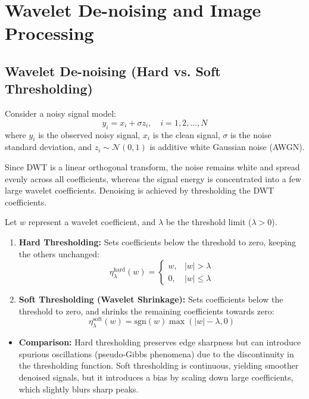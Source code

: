 \documentclass[12pt,a4paper]{article}
\begin{document}
\section{Wavelet De-noising and Image Processing}

\subsection{Wavelet De-noising (Hard vs. Soft Thresholding)}
Consider a noisy signal model:
$$y_i = x_i + \sigma z_i, \quad i = 1, 2, \dots, N$$
where $y_i$ is the observed noisy signal, $x_i$ is the clean signal, $\sigma$ is the noise standard deviation, and $z_i \sim \mathcal{N}(0, 1)$ is additive white Gaussian noise (AWGN).

Since DWT is a linear orthogonal transform, the noise remains white and spread evenly across all coefficients, whereas the signal energy is concentrated into a few large wavelet coefficients. Denoising is achieved by thresholding the DWT coefficients.

\begin{tcolorbox}[formulabox, title={\textbf{Hard and Soft Thresholding Formulations}}]
Let $w$ represent a wavelet coefficient, and $\lambda$ be the threshold limit ($\lambda > 0$).
\begin{enumerate}[leftmargin=*, itemsep=4pt, label=\arabic*.]
  \item \textbf{Hard Thresholding:} Sets coefficients below the threshold to zero, keeping the others unchanged:
        $$\eta_\lambda^{\text{hard}}(w) = \begin{cases} w, & |w| > \lambda \\ 0, & |w| \le \lambda \end{cases}$$
  \item \textbf{Soft Thresholding (Wavelet Shrinkage):} Sets coefficients below the threshold to zero, and shrinks the remaining coefficients towards zero:
        $$\eta_\lambda^{\text{soft}}(w) = \text{sgn}(w)\max(|w| - \lambda, 0)$$
\end{enumerate}
\end{tcolorbox}

\begin{itemize}[leftmargin=*, itemsep=4.5pt]
  \item \textbf{Comparison:} Hard thresholding preserves edge sharpness but can introduce spurious oscillations (pseudo-Gibbs phenomena) due to the discontinuity in the thresholding function. Soft thresholding is continuous, yielding smoother denoised signals, but it introduces a bias by scaling down large coefficients, which slightly blurs sharp peaks.
\end{itemize}
\end{document}
